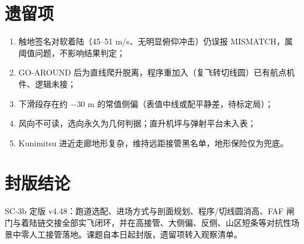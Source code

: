 \documentclass[12pt,UTF8,a4paper]{ctexart}
\begin{document}
\section{遗留项}
\begin{enumerate}
\item 触地签名对软着陆（45--51 m/s、无明显俯仰冲击）仍误报 MISMATCH，属阈值问题，不影响结果判定；
\item GO-AROUND 后为直线爬升脱离，程序重加入（复飞转切线圆）已有航点机件、逻辑未接；
\item 下滑段存在约 $-30$ m 的常值侧偏（表值中线或配平静差，待标定局）；
\item 风向不可读，选向永久为几何判据；直升机坪与弹射平台未入表；
\item Kunimitsu 进近走廊地形复杂，维持远距接管黑名单，地形保险仅为兜底。
\end{enumerate}

\section{封版结论}
SC-3b 定版 v4.48：跑道选配、进场方式与剖面规划、程序/切线圆消高、FAF 闸门与着陆链交接全部实飞闭环，并在高接管、大侧偏、反侧、山区短条等对抗性场景中零人工接管落地。课题自本日起封版，遗留项转入观察清单。
\end{document}
